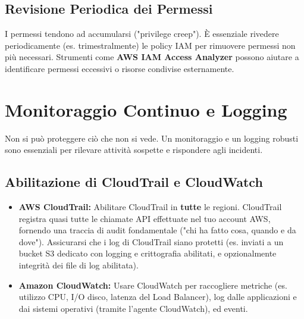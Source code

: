 \subsection{Revisione Periodica dei Permessi}
\label{subsec:iam-review}
I permessi tendono ad accumularsi ("privilege creep"). È essenziale rivedere periodicamente (es. trimestralmente) le policy IAM per rimuovere permessi non più necessari. Strumenti come \textbf{AWS IAM Access Analyzer} possono aiutare a identificare permessi eccessivi o risorse condivise esternamente.

\section{Monitoraggio Continuo e Logging}
\label{sec:monitoring-logging}
Non si può proteggere ciò che non si vede. Un monitoraggio e un logging robusti sono essenziali per rilevare attività sospette e rispondere agli incidenti.

\subsection{Abilitazione di CloudTrail e CloudWatch}
\label{subsec:cloudtrail-cloudwatch-enable}
\begin{itemize}
    \item \textbf{AWS CloudTrail:} Abilitare CloudTrail in \textbf{tutte} le regioni. CloudTrail registra quasi tutte le chiamate API effettuate nel tuo account AWS, fornendo una traccia di audit fondamentale ("chi ha fatto cosa, quando e da dove"). Assicurarsi che i log di CloudTrail siano protetti (es. inviati a un bucket S3 dedicato con logging e crittografia abilitati, e opzionalmente integrità dei file di log abilitata).
    \item \textbf{Amazon CloudWatch:} Usare CloudWatch per raccogliere metriche (es. utilizzo CPU, I/O disco, latenza del Load Balancer), log dalle applicazioni e dai sistemi operativi (tramite l'agente CloudWatch), ed eventi.
\end{itemize}

